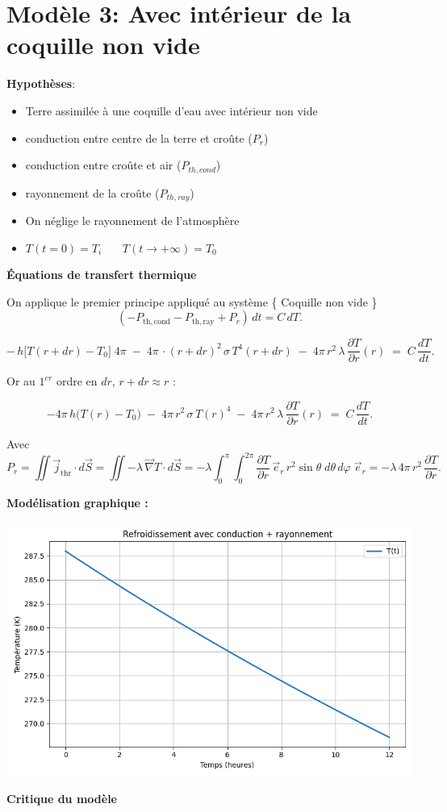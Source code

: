 \documentclass[a4paper,12pt]{article}
\begin{document}
\part{Modèle 3: Avec intérieur de la coquille non vide }
\textbf{Hypothèses}:
\begin{itemize}
    \item Terre assimilée à une coquille d'eau avec intérieur non vide 
    \item  conduction entre centre de la terre et croûte (\(P_r\))
    \item  conduction entre croûte et air (\(P_{th,cond}\))
    \item  rayonnement de la croûte (\(P_{th,ray}\))
    \item On néglige le rayonnement de l'atmosphère
    \item $T(t=0) = T_i$ \ \ \
$T(t \to +\infty) = T_0$
    
    
    
\end{itemize}

\textbf{Équations de transfert thermique}

On applique le premier principe appliqué au système \{ Coquille non vide  \}
\[
(-P_{\mathrm{th,cond}} - P_{\mathrm{th,ray}} + P_r)\,dt = C\,dT.
\]

\[
-\,h\bigl[T(r+dr)-T_0\bigr]\;4\pi
\;-\;4\pi\,\cdot (r+dr)^2\,\sigma\,T^4(r+dr)
\;-\;4\pi\,r^2\,\lambda\,\frac{\partial T}{\partial r}(r)
\;=\;C\,\frac{dT}{dt}.
\]

\medskip

Or au \(1^{er}\) ordre en \(dr\), \(r+dr\approx r\) :

\[
-4\pi\,h\bigl(T(r)-T_0\bigr)
\;-\;4\pi\,r^2\,\sigma\,T(r)^4
\;-\;4\pi\,r^2\,\lambda\,\frac{\partial T}{\partial r}(r)
\;=\;C\,\frac{dT}{dt}.
\]

\medskip

Avec
\[
P_{r}
= \iint\vec j_{\mathrm{thr}}\cdot d\vec S
= \iint -\lambda\,\vec{ \nabla } T\cdot d\vec S
= -\lambda
  \int_{0}^{\pi}\!\!\int_{0}^{2\pi}
    \frac{\partial T}{\partial r}\,\vec e_{r}\,
    r^2\sin\theta\;d\theta\,d\varphi\;\vec e_{r}
= -\lambda\,4\pi\,r^2\,\frac{\partial T}{\partial r}.
\]

\textbf{Modélisation graphique :} 
    
    \includegraphics[width=0.8\linewidth]{../modele3/figures/modele3_coquille-conduction-rayonnement.png}    


\textbf{Critique du modèle}
\vspace{1cm}
\end{document}
